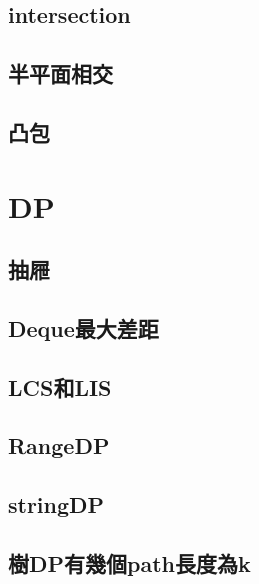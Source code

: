     \subsection{intersection}
        
    \subsection{半平面相交}
        
    \subsection{凸包}
        

\section{DP}
    \subsection{抽屜}
        
    \subsection{Deque最大差距}
        
    \subsection{LCS和LIS}
        
    \subsection{RangeDP}
        
    \subsection{stringDP}
        
    \subsection{樹DP有幾個path長度為k}
        
